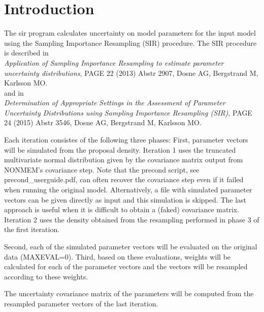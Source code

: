 
\usepackage{amsmath}



\maketitle

\newcommand{\guidetoolname}{sir}

\section{Introduction}
The sir program calculates uncertainty
on model parameters for the input model using the Sampling Importance Resampling (SIR) procedure.
The SIR procedure is described in\\
\emph{Application of Sampling Importance Resampling to estimate parameter uncertainty distributions}, 
PAGE 22 (2013) Abstr 2907, Dosne AG, Bergstrand M, Karlsson MO.\\
and in\\
\emph{Determination of Appropriate Settings in the Assessment of Parameter Uncertainty Distributions 
using Sampling Importance Resampling (SIR)}, 
PAGE 24 (2015) Abstr 3546, Dosne AG, Bergstrand M, Karlsson MO.
 
Each iteration consistes of the following three phases: First, parameter vectors will be simulated from the 
proposal density. Iteration 1 uses the
truncated multivariate normal distribution 
given by the covariance matrix output from NONMEM's covariance step.
Note that the precond script, see precond\_userguide.pdf, can often recover the covariance step
even if it failed when running the original model.
Alternatively, a file with simulated parameter vectors can be given directly as input and this simulation is skipped. The last approach is useful when it is
difficult to obtain a (faked) covariance matrix. Iteration 2 uses the density obtained from the resampling performed in phase 3 of the first iteration.

Second, each of the simulated parameter vectors will be evaluated on the original data (MAXEVAL=0).
Third, based on these evaluations, weights will be calculated for each of the parameter vectors and the vectors 
will be resampled according to these weights. 

The uncertainty covariance matrix of the parameters 
will be computed from the resampled parameter vectors of the last iteration.

